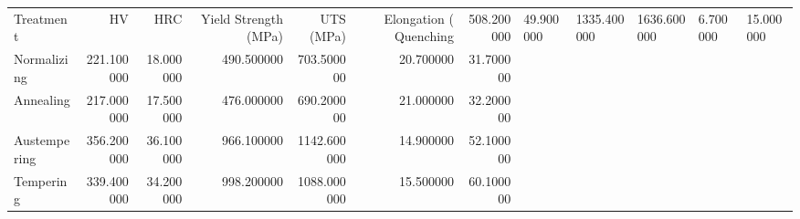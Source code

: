 \begin{tabular}{lrrrrrr}
\toprule
Treatment & HV & HRC & Yield Strength (MPa) & UTS (MPa) & Elongation (%
\midrule
Quenching & 508.200000 & 49.900000 & 1335.400000 & 1636.600000 & 6.700000 & 15.000000 \\
Normalizing & 221.100000 & 18.000000 & 490.500000 & 703.500000 & 20.700000 & 31.700000 \\
Annealing & 217.000000 & 17.500000 & 476.000000 & 690.200000 & 21.000000 & 32.200000 \\
Austempering & 356.200000 & 36.100000 & 966.100000 & 1142.600000 & 14.900000 & 52.100000 \\
Tempering & 339.400000 & 34.200000 & 998.200000 & 1088.000000 & 15.500000 & 60.100000 \\
\bottomrule
\end{tabular}
